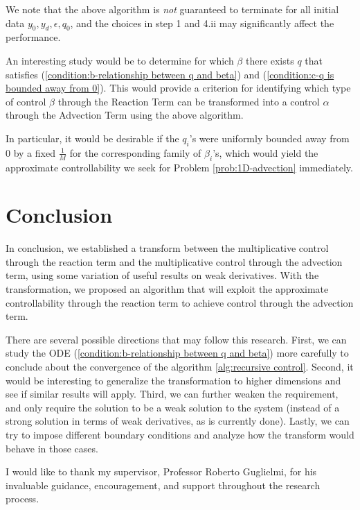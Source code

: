 \documentclass{ifacconf}
\begin{document}
We note that the above algorithm is \textit{not} guaranteed to terminate for all initial data $y_0, y_d, \epsilon, q_0$, and the choices in step 1 and 4.ii may significantly affect the performance.

An interesting study would be to determine for which $\beta$ there exists $q$ that satisfies (\ref{condition:b-relationship between q and beta}) and (\ref{condition:c-q is bounded away from 0}).
This would provide a criterion for identifying which type of control $\beta$ through the Reaction Term can be transformed into a control $\alpha$ through the Advection Term using the above algorithm.

In particular, it would be desirable if the $q_i$'s were uniformly bounded away from 0 by a fixed $\frac{1}{M}$ for the corresponding family of $\beta_i$'s, which would yield the approximate controllability we seek for Problem \ref{prob:1D-advection} immediately.

\section{Conclusion}

In conclusion, we established a transform between the multiplicative control through the reaction term and the multiplicative control through the advection term, using some variation of useful results on weak derivatives. With the transformation, we proposed an algorithm that will exploit the approximate controllability through the reaction term to achieve control through the advection term.

There are several possible directions that may follow this research. First, we can study the ODE (\ref{condition:b-relationship between q and beta}) more carefully to conclude about the convergence of the algorithm \ref{alg:recursive control}. Second, it would be interesting to generalize the transformation to higher dimensions and see if similar results will apply. Third, we can further weaken the requirement, and only require the solution to be a weak solution to the system (instead of a strong solution in terms of weak derivatives, as is currently done). Lastly, we can try to impose different boundary conditions and analyze how the transform would behave in those cases.

\begin{ack}
I would like to thank my supervisor, Professor Roberto Guglielmi, for his invaluable guidance, encouragement, and support throughout the research process.
\end{ack}
\end{document}
